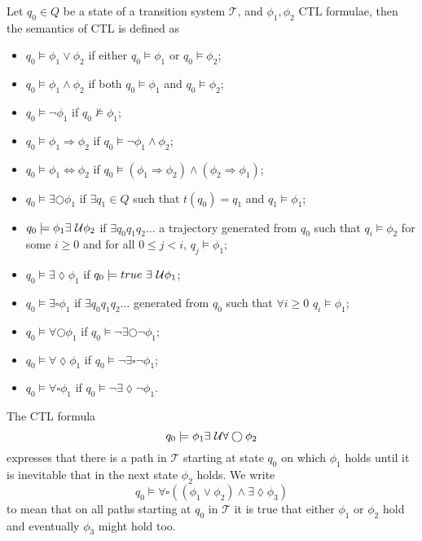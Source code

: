 \begin{defi}
Let $q_{0}\in Q$ be a state of a transition system $\mathcal{T}$, and $\phi_{1},\phi_{2}$ CTL formulae, then the semantics of CTL is defined as
\begin{itemize}
    \item{$q_{0}\models\phi_{1}\lor\phi_{2}$ if either $q_{0}\models\phi_{1}$ or $q_{0}\models\phi_{2}$;}
    \item{$q_{0}\models\phi_{1}\land\phi_{2}$ if both $q_{0}\models\phi_{1}$ and $q_{0}\models\phi_{2}$;}
    \item{$q_{0}\models\lnot\phi_{1}$ if $q_{0}\not\models\phi_{1}$;}
    \item{$q_{0}\models\phi_{1}\Rightarrow\phi_{2}$ if $q_{0}\models\lnot\phi_{1} \land \phi_{2}$;}
    \item{$q_{0}\models\phi_{1}\Leftrightarrow\phi_{2}$ if $q_{0}\models(\phi_{1}\Rightarrow\phi_{2})\land(\phi_{2}\Rightarrow\phi_{1})$;}
    \item{$q_{0}\models\exists\bigcirc\phi_{1}$ if $\exists q_{1}\in Q$ such that
    $t(q_{0})=q_{1}$ and $q_{1}\models \phi_{1}$;}
    \item{$q_{0}\models\phi_{1}\exists\ \mathcal{U}\phi_{2}$ if $\exists q_{0}q_{1}q_{2}\ldots$ a trajectory generated from $q_{0}$ such that $q_{i}\models \phi_{2}$ for some $i\geq 0$ and for all $0\leq j < i$, $q_{j}\models \phi_{1}$;}
    \item{$q_{0}\models\exists\lozenge\phi_{1}$ if $q_{0}\models true\ \exists\ \mathcal{U} \phi_{1}$;}
    \item{$q_{0}\models\exists\square\phi_{1}$ if $\exists q_{0}q_{1}q_{2}\ldots$ generated from $q_{0}$ such that $\forall i\geq 0$ $q_{i}\models\phi_{1}$;}

    \item{$q_{0}\models\forall\bigcirc\phi_{1}$ if $q_{0}\models\lnot\exists\bigcirc\lnot\phi_{1}$;}
    \item{$q_{0}\models\forall\lozenge\phi_{1}$ if $q_{0}\models\lnot\exists\square\lnot\phi_{1}$;}
    \item{$q_{0}\models\forall\square\phi_{1}$ if $q_{0}\models\lnot\exists\lozenge\lnot\phi_{1}$.}
\end{itemize}
\end{defi}


\begin{ex}
The CTL formula
\[
q_{0}\models \phi_{1}\exists\ \mathcal{U}\forall\bigcirc \phi_{2}
\]
expresses that there is a path in $\mathcal{T}$ starting at state $q_{0}$ on which $\phi_{1}$ holds until it is inevitable that in the next state $\phi_{2}$ holds.
We write
\[
q_{0}\models\forall\square((\phi_{1}\lor\phi_{2})\land\exists\lozenge\phi_{3})
\]
to mean that on all paths starting at $q_{0}$ in $\mathcal{T}$ it is true that either $\phi_{1}$ or $\phi_{2}$ hold and eventually $\phi_{3}$ might hold too.
\end{ex}

